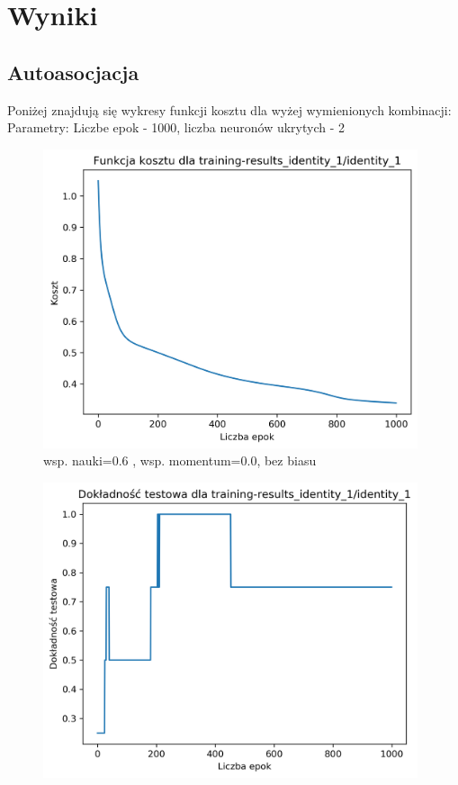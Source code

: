 \documentclass{classrep}
\begin{document}
    \section{Wyniki}
    {
        \subsection{Autoasocjacja}
        {
            Poniżej znajdują się wykresy funkcji kosztu dla wyżej wymienionych kombinacji:
            Parametry: Liczbe epok - 1000, liczba neuronów ukrytych - 2
            \begin{figure}[!htbp]
                \centering
                \includegraphics[width=110mm]{wykresy/identity_1_cost.png}
                \caption{wsp. nauki=0.6 , wsp. momentum=0.0, bez biasu}
            \end{figure}
            \begin{figure}[!htbp]
                \centering
                \includegraphics[width=110mm]{wykresy/identity_1_testing-accuracy.png}

\end{figure}}}
\end{document}
